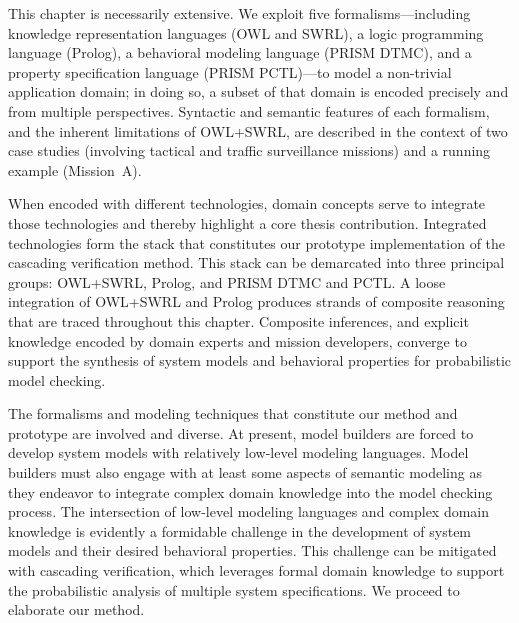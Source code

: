 This chapter is necessarily extensive. We exploit five formalisms---including knowledge representation languages (OWL and SWRL), a logic programming language (Prolog), a behavioral modeling language (PRISM DTMC), and a property specification language (PRISM PCTL)---to model a non-trivial application domain; in doing so, a subset of that domain is encoded precisely and from multiple perspectives. Syntactic and semantic features of each formalism, and the inherent limitations of OWL+SWRL, are described in the context of two case studies (involving tactical and traffic surveillance missions) and a running example (Mission~A).

When encoded with different technologies, domain concepts serve to integrate those technologies and thereby highlight a core thesis contribution. Integrated technologies form the stack that constitutes our prototype implementation of the cascading verification method. This stack can be demarcated into three principal groups: OWL+SWRL, Prolog, and PRISM DTMC and PCTL\@. A loose integration of OWL+SWRL and Prolog produces strands of composite reasoning that are traced throughout this chapter. Composite inferences, and explicit knowledge encoded by domain experts and mission developers, converge to support the synthesis of system models and behavioral properties for probabilistic model checking.

The formalisms and modeling techniques that constitute our method and prototype are involved and diverse. At present, model builders are forced to develop system models with relatively low-level modeling languages. Model builders must also engage with at least some aspects of semantic modeling as they endeavor to integrate complex domain knowledge into the model checking process. The intersection of low-level modeling languages and complex domain knowledge is evidently a formidable challenge in the development of system models and their desired behavioral properties. This challenge can be mitigated with cascading verification, which leverages formal domain knowledge to support the probabilistic analysis of multiple system specifications. We proceed to elaborate our method.
